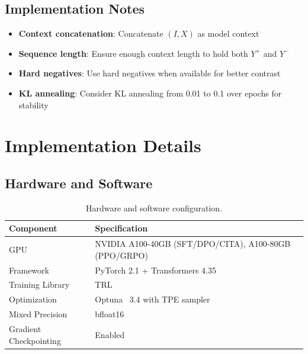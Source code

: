 \subsection{Implementation Notes}

\begin{itemize}[leftmargin=*,itemsep=2pt]
    \item \textbf{Context concatenation}: Concatenate $(I, X)$ as model context
    \item \textbf{Sequence length}: Ensure enough context length to hold both $Y^+$ and $Y^-$
    \item \textbf{Hard negatives}: Use hard negatives when available for better contrast
    \item \textbf{KL annealing}: Consider KL annealing from 0.01 to 0.1 over epochs for stability
\end{itemize}

\section{Implementation Details}
\label{sec:appendix_implementation}

\subsection{Hardware and Software}

\begin{table}[H]
\centering
\small
\begin{tabular}{@{}ll@{}}
\toprule
\textbf{Component} & \textbf{Specification} \\
\midrule
GPU & NVIDIA A100-40GB (SFT/DPO/CITA), A100-80GB (PPO/GRPO) \\
\hline
Framework & PyTorch 2.1 + Transformers 4.35 \\
\hline
Training Library & TRL~\cite{tunstall2023zephyr} \\
\hline
Optimization & Optuna~\cite{akiba2019optuna} 3.4 with TPE sampler \\
\hline
Mixed Precision & bfloat16 \\
\hline
Gradient Checkpointing & Enabled \\
\bottomrule
\end{tabular}
\caption{Hardware and software configuration.}
\label{tab:hardware}
\end{table}

